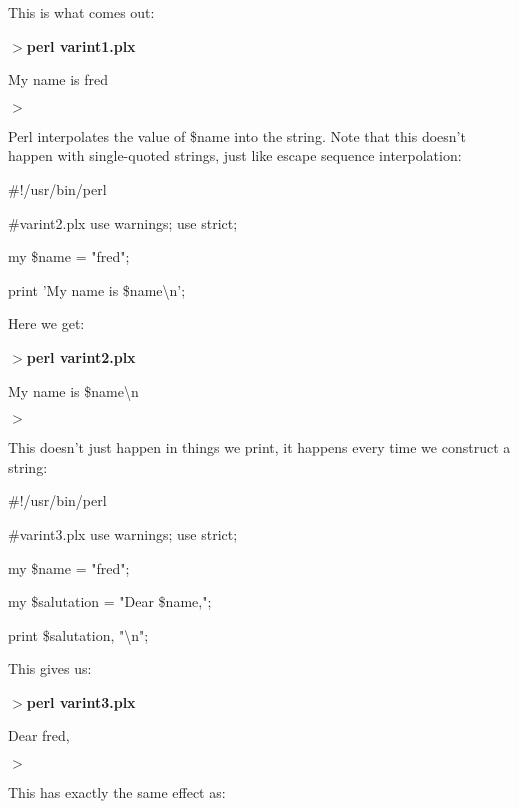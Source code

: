 \documentclass[a4paper,11pt]{book}
\begin{document}
\noindent 

\noindent This is what comes out:

\noindent 

\noindent $>$\textbf{perl varint1.plx}

\noindent My name is fred

\noindent $>$

\noindent 

\noindent Perl interpolates the value of \$name into the string. Note that this doesn't happen with single-quoted strings, just like escape sequence interpolation:

\noindent 

\noindent \#!/usr/bin/perl

\noindent \#varint2.plx use warnings; use strict;

\noindent my \$name = "fred";

\noindent print 'My name is \$name\textbackslash n';

\noindent 

\noindent Here we get:

\noindent 

\noindent $>$\textbf{perl varint2.plx}

\noindent My name is \$name\textbackslash n

\noindent $>$

\noindent 

\noindent This doesn't just happen in things we print, it happens every time we construct a string:

\noindent 

\noindent \#!/usr/bin/perl

\noindent \#varint3.plx use warnings; use strict;

\noindent my \$name = "fred";

\noindent my \$salutation = "Dear \$name,";

\noindent print \$salutation, "\textbackslash n";

\noindent 

\noindent This gives us:

\noindent 

\noindent $>$\textbf{perl varint3.plx}

\noindent Dear fred,

\noindent $>$

\noindent 

\noindent 

\noindent This has exactly the same effect as:
\end{document}
